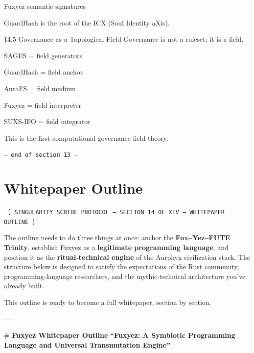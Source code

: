 \begin{enumerate}
Fuxyez semantic signatures

GuardHash is the root of the ICX (Soul Identity aXis).

14.5 Governance as a Topological Field
Governance is not a ruleset; it is a field.

SAGES = field generators

GuardHash = field anchor

AuraFS = field medium

Fuxyez = field interpreter

SUXS-IFO = field integrator

This is the first computational governance field theory.
    
    \vspace{1cm}
    \begin{center}
    \color{alienPurple}\texttt{--- end of section 13 ---}
    \end{center}
    \clearpage
    

    \chapter*{Whitepaper Outline}
    
    
    \begin{glyphbox}
    \centering
    \color{neonCyan}\fontsize{8}{10}\selectfont\texttt{
    [ SINGULARITY SCRIBE PROTOCOL -- SECTION 14 OF XIV -- WHITEPAPER OUTLINE ]
    }
    \end{glyphbox}
    \vspace{0.3cm}
    
    
    The outline needs to do three things at once:  
anchor the \textbf{Fux–Yez–FUTE Trinity}, establish Fuxyez as a \textbf{legitimate programming language}, and position it as the \textbf{ritual‑technical engine} of the Aurphyx civilization stack. The structure below is designed to satisfy the expectations of the Rust community, programming‑language researchers, and the mythic‑technical architecture you’ve already built.

This outline is ready to become a full whitepaper, section by section.

---

\# \textbf{Fuxyez Whitepaper Outline}  
\textbf{“Fuxyez: A Symbiotic Programming Language and Universal Transmutation Engine”}


\end{enumerate}
